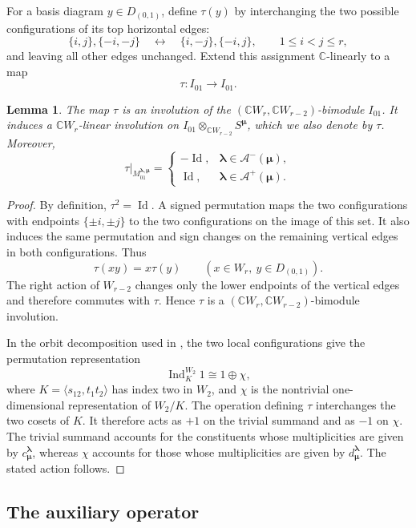 \documentclass[10pt,a4paper]{amsart}
\newtheorem{lemma}[theorem]{Lemma}
\DeclareMathOperator {\Ind}{Ind}
\newcommand{\C}{\mathbb{C}}
\newcommand{\1}{\mathfrak{1}}
\begin{document}
For a basis diagram $y\in D_{(0,1)}$, define $\tau(y)$
by interchanging the two possible configurations of its
top horizontal edges:
$$
\{i,j\},\{-i,-j\}
\quad\longleftrightarrow\quad
\{i,-j\},\{-i,j\},
\qquad 1\leq i<j\leq r,
$$
and leaving all other edges unchanged. Extend this assignment
$\C$-linearly to a map
$$
\tau:I_{01}\longrightarrow I_{01}.
$$

\begin{lemma}\label{lem:exact-tau-action}
The map $\tau$ is an involution of the
$(\C W_r,\C W_{r-2})$-bimodule $I_{01}$. It induces a
$\C W_r$-linear involution on
$I_{01}\otimes_{\C W_{r-2}}S^{\bm\mu}$, which we also
denote by $\tau$. Moreover,
$$
\tau\big|_{M_{01}^{\bm\lambda,\bm\mu}}
=
\begin{cases}
-\operatorname{Id},
& \bm\lambda\in\mathcal A^-(\bm\mu),\\
\operatorname{Id},
& \bm\lambda\in\mathcal A^+(\bm\mu).
\end{cases}
$$
\end{lemma}

\begin{proof}
By definition, $\tau^2=\operatorname{Id}$. A signed
permutation maps the two configurations with endpoints
$\{\pm i,\pm j\}$ to the two configurations on the image
of this set. It also induces the same permutation and sign
changes on the remaining vertical edges in both configurations.
Thus
$$
\tau(xy)=x\tau(y)
\qquad(x\in W_r,\ y\in D_{(0,1)}).
$$
The right action of $W_{r-2}$ changes only the lower endpoints
of the vertical edges and therefore commutes with $\tau$.
Hence $\tau$ is a
$(\C W_r,\C W_{r-2})$-bimodule involution.

In the orbit decomposition used in
\cite[Section~3]{KCTprevious}, the two local configurations
give the permutation representation
$$
\Ind_K^{W_2}1\cong1\oplus\chi,
$$
where $K=\langle s_{12},t_1t_2\rangle$ has index two in
$W_2$, and $\chi$ is the nontrivial one-dimensional
representation of $W_2/K$. The operation defining $\tau$
interchanges the two cosets of $K$. It therefore acts as
$+1$ on the trivial summand and as $-1$ on $\chi$.
The trivial summand accounts for the constituents whose
multiplicities are given by $c_{\bm\mu}^{\bm\lambda}$,
whereas $\chi$ accounts for those whose multiplicities
are given by $d_{\bm\mu}^{\bm\lambda}$.
The stated action follows.
\end{proof}

\subsection{The auxiliary operator}
\end{document}
